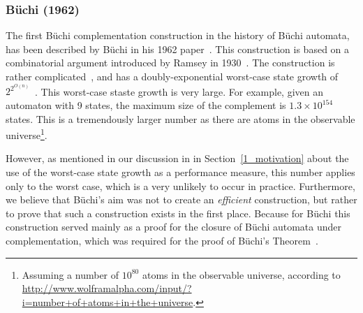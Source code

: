 

\subsubsection{Büchi (1962)}
\label{2_buchi62}
The first Büchi complementation construction in the history of Büchi automata, has been described by Büchi in his 1962 paper~\cite{buchi1960decision}. This construction is based on a combinatorial argument introduced by Ramsey in 1930~\cite{1930ramsey}. The construction is rather complicated~\cite{vardi2005buchi}, and has a doubly-exponential worst-case state growth of $2^{2^{O\left(n\right)}}$~\cite{2007_vardi}. This worst-case staste growth is very large. For example, given an automaton with 9 states, the maximum size of the complement is $1.3 \times 10^{154}$ states. This is a tremendously larger number as there are atoms in the observable universe\footnote{Assuming a number of $10^{80}$ atoms in the observable universe, according to \url{http://www.wolframalpha.com/input/?i=number+of+atoms+in+the+universe}.}.

However, as mentioned in our discussion in in Section~\ref{1_motivation} about the use of the worst-case state growth as a performance measure, this number applies only to the worst case, which is a very unlikely to occur in practice. Furthermore, we believe that Büchi's aim was not to create an \textit{efficient} construction, but rather to prove that such a construction exists in the first place. Because for Büchi this construction served mainly as a proof for the closure of Büchi automata under complementation, which was required for the proof of Büchi's Theorem~\cite{vardi2007automata}.



